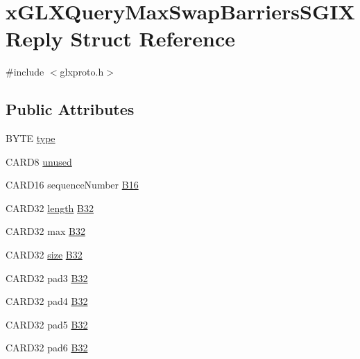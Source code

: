 \hypertarget{structx_g_l_x_query_max_swap_barriers_s_g_i_x_reply}{}\section{x\+G\+L\+X\+Query\+Max\+Swap\+Barriers\+S\+G\+I\+X\+Reply Struct Reference}
\label{structx_g_l_x_query_max_swap_barriers_s_g_i_x_reply}


{\ttfamily \#include $<$glxproto.\+h$>$}

\subsection*{Public Attributes}
\begin{DoxyCompactItemize}
\item 
B\+Y\+TE \hyperlink{structx_g_l_x_query_max_swap_barriers_s_g_i_x_reply_aa8def402c5fab026f154699c28f486b3}{type}
\item 
C\+A\+R\+D8 \hyperlink{structx_g_l_x_query_max_swap_barriers_s_g_i_x_reply_a254dc4e6a7f781c59b56bace0027b2d8}{unused}
\item 
C\+A\+R\+D16 sequence\+Number \hyperlink{structx_g_l_x_query_max_swap_barriers_s_g_i_x_reply_a9ce9da788539491fc40c06f58b0f956e}{B16}
\item 
C\+A\+R\+D32 \hyperlink{glcorearb_8h_ab9c919755bde3b34349e23a32b4e0fa7}{length} \hyperlink{structx_g_l_x_query_max_swap_barriers_s_g_i_x_reply_a76a9ac00b0760d9df6006500dea2a3d1}{B32}
\item 
C\+A\+R\+D32 max \hyperlink{structx_g_l_x_query_max_swap_barriers_s_g_i_x_reply_a0811016ec765313d9c72e178758984c8}{B32}
\item 
C\+A\+R\+D32 \hyperlink{glcorearb_8h_a3d1e3edfcf61ca2d831883e1afbad89e}{size} \hyperlink{structx_g_l_x_query_max_swap_barriers_s_g_i_x_reply_a6b2d236e0221285b1b9cf4d3722131e3}{B32}
\item 
C\+A\+R\+D32 pad3 \hyperlink{structx_g_l_x_query_max_swap_barriers_s_g_i_x_reply_aa950377f19770effdc1260d42baabf41}{B32}
\item 
C\+A\+R\+D32 pad4 \hyperlink{structx_g_l_x_query_max_swap_barriers_s_g_i_x_reply_ae74bb76ebbd89ae21ed2d41871e63dbb}{B32}
\item 
C\+A\+R\+D32 pad5 \hyperlink{structx_g_l_x_query_max_swap_barriers_s_g_i_x_reply_a3a1ccb6742d371c38a3ae110478767b1}{B32}
\item 
C\+A\+R\+D32 pad6 \hyperlink{structx_g_l_x_query_max_swap_barriers_s_g_i_x_reply_a067424ae0b448bb940d13eea5af8fa57}{B32}
\end{DoxyCompactItemize}


